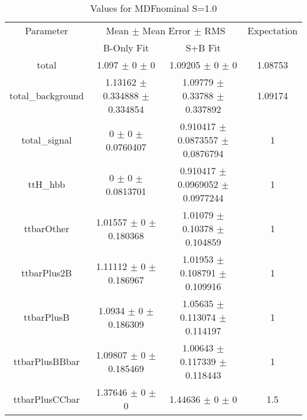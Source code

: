 \begin{table}
\centering
\caption{Values for MDFnominal S=1.0}
\begin{tabular}{cccc}
\toprule
Parameter & \multicolumn{2}{c}{Mean $\pm$ Mean Error $\pm$ RMS} & Expectation\\
 & B-Only Fit & S+B Fit & \\
\midrule
total & \num{1.097} $\pm$ \num{0} $\pm$ \num{0} & \num{1.09205} $\pm$ \num{0} $\pm$ \num{0} & \num{1.08753}\\
total\_background & \num{1.13162} $\pm$ \num{0.334888} $\pm$ \num{0.334854} & \num{1.09779} $\pm$ \num{0.33788} $\pm$ \num{0.337892} & \num{1.09174}\\
total\_signal & \num{0} $\pm$ \num{0} $\pm$ \num{0.0760407} & \num{0.910417} $\pm$ \num{0.0873557} $\pm$ \num{0.0876794} & \num{1}\\
ttH\_hbb & \num{0} $\pm$ \num{0} $\pm$ \num{0.0813701} & \num{0.910417} $\pm$ \num{0.0969052} $\pm$ \num{0.0977244} & \num{1}\\
ttbarOther & \num{1.01557} $\pm$ \num{0} $\pm$ \num{0.180368} & \num{1.01079} $\pm$ \num{0.10378} $\pm$ \num{0.104859} & \num{1}\\
ttbarPlus2B & \num{1.11112} $\pm$ \num{0} $\pm$ \num{0.186967} & \num{1.01953} $\pm$ \num{0.108791} $\pm$ \num{0.109916} & \num{1}\\
ttbarPlusB & \num{1.0934} $\pm$ \num{0} $\pm$ \num{0.186309} & \num{1.05635} $\pm$ \num{0.113074} $\pm$ \num{0.114197} & \num{1}\\
ttbarPlusBBbar & \num{1.09807} $\pm$ \num{0} $\pm$ \num{0.185469} & \num{1.00643} $\pm$ \num{0.117339} $\pm$ \num{0.118443} & \num{1}\\
ttbarPlusCCbar & \num{1.37646} $\pm$ \num{0} $\pm$ \num{0} & \num{1.44636} $\pm$ \num{0} $\pm$ \num{0} & \num{1.5}\\
\bottomrule
\end{tabular}
\end{table}